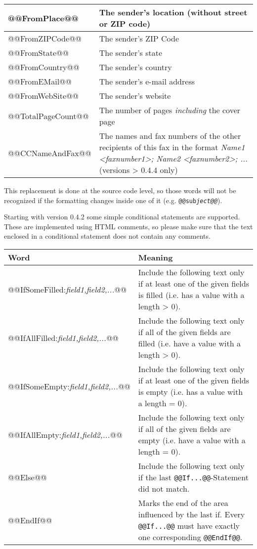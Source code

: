 \documentclass[a4paper,10pt]{scrartcl}
\begin{document}
\begin{center}
\begin{tabular}{|l|p{}|}
\ttfamily @@FromPlace@@ & The sender's  location (without street or ZIP code)\\\hline
\ttfamily @@FromZIPCode@@ & The sender's  ZIP Code \\\hline
\ttfamily @@FromState@@ & The sender's  state\\\hline
\ttfamily @@FromCountry@@ & The sender's  country\\\hline
\ttfamily @@FromEMail@@ & The sender's  e-mail address\\\hline
\ttfamily @@FromWebSite@@ & The sender's website\\\hline
\ttfamily @@TotalPageCount@@ & The number of pages \textit{including} the cover page \\\hline
\ttfamily @@CCNameAndFax@@ & The names and fax numbers of the other recipients of this fax in the format \textit{Name1 <faxnumber1>; Name2 <faxnumber2>; ...} (versions > 0.4.4 only)\\\hline
\end{tabular}
\end{center}

This replacement is done at the source code level, so those words will not be recognized if the formatting changes inside one of it (e.g. \texttt{@@sub\textit{ject@@}}).

Starting with version 0.4.2 some simple conditional statements are supported. These are implemented using HTML comments, so please make sure that the text enclosed in a conditional statement does not contain any comments.
\begin{center}
\begin{tabular}{|l|p{}|}
\hline
\bfseries Word & \bfseries Meaning \\
\hline\hline
\ttfamily @@IfSomeFilled:\textit{field1,field2,...}@@ & Include the following text only if at least one of the given fields is filled (i.e. has a value with a length > 0).\\\hline
\ttfamily @@IfAllFilled:\textit{field1,field2,...}@@ & Include the following text only if all of the given fields are filled (i.e. have a value with a length > 0).\\\hline
\ttfamily @@IfSomeEmpty:\textit{field1,field2,...}@@ & Include the following text only if at least one of the given fields is empty (i.e. has a value with a length = 0).\\\hline
\ttfamily @@IfAllEmpty:\textit{field1,field2,...}@@ & Include the following text only if all of the given fields are empty (i.e. have a value with a length = 0).\\\hline
\ttfamily @@Else@@ & Include the following text only if the last \texttt{@@If...@@}-Statement did not match.\\\hline
\ttfamily @@EndIf@@ & Marks the end of the area influenced by the last if. Every \texttt{@@If...@@} must have exactly one corresponding \texttt{@@EndIf@@}.\\\hline
\end{tabular}
\end{center}
\end{document}
